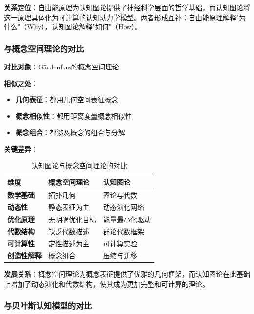 \documentclass[12pt,a4paper]{article}
\begin{document}
\textbf{关系定位}：自由能原理为认知图论提供了神经科学层面的哲学基础，而认知图论将这一原理具体化为可计算的认知动力学模型。两者形成互补：自由能原理解释"为什么"（Why），认知图论解释"如何"（How）。

\subsubsection{与概念空间理论的对比}
\label{subsubsec:vs_conceptual_spaces}

\textbf{对比对象}：Gärdenfors的概念空间理论 \cite{gardenfors2004conceptual}

\textbf{相似之处}：
\begin{itemize}
\item \textbf{几何表征}：都用几何空间表征概念
\item \textbf{概念相似性}：都用距离度量概念相似性
\item \textbf{概念组合}：都涉及概念的组合与分解
\end{itemize}

\textbf{关键差异}：
\begin{table}[H]
\centering
\caption{认知图论与概念空间理论的对比}
\label{tab:vs_conceptual_spaces}
\begin{tabular}{p{3cm}p{4cm}p{4cm}}
\toprule
\textbf{维度} & \textbf{概念空间理论} & \textbf{认知图论} \\
\midrule
\textbf{数学基础} & 拓扑几何 & 图论与代数 \\
\textbf{动态性} & 静态表征为主 & 动态演化网络 \\
\textbf{优化原理} & 无明确优化目标 & 能量最小化驱动 \\
\textbf{代数结构} & 缺乏代数描述 & 群论代数框架 \\
\textbf{可计算性} & 定性描述为主 & 可计算实验 \\
\textbf{创造性解释} & 概念组合 & 压缩与迁移 \\
\bottomrule
\end{tabular}
\end{table}

\textbf{发展关系}：概念空间理论为概念表征提供了优雅的几何框架，而认知图论在此基础上增加了动态演化和代数结构，使其成为更加完整和可计算的理论。

\subsubsection{与贝叶斯认知模型的对比}
\label{subsubsec:vs_bayesian_models}
\end{document}
